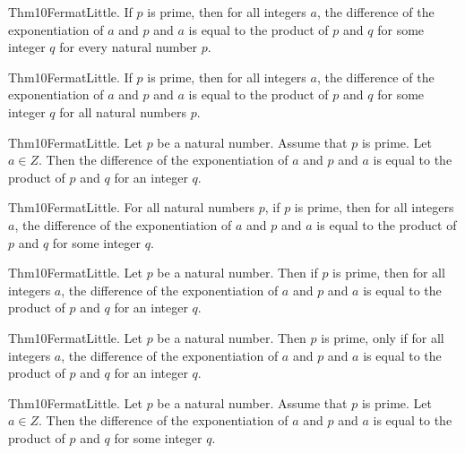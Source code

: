 \documentclass{article}
\begin{document}
Thm10FermatLittle. If $p$ is prime, then for all integers $a$, the difference of the exponentiation of $a$ and $p$ and $a$ is equal to the product of $p$ and $q$ for some integer $q$ for every natural number $p$.

Thm10FermatLittle. If $p$ is prime, then for all integers $a$, the difference of the exponentiation of $a$ and $p$ and $a$ is equal to the product of $p$ and $q$ for some integer $q$ for all natural numbers $p$.

Thm10FermatLittle. Let $p$ be a natural number. Assume that $p$ is prime. Let $a \in Z$. Then the difference of the exponentiation of $a$ and $p$ and $a$ is equal to the product of $p$ and $q$ for an integer $q$.

Thm10FermatLittle. For all natural numbers $p$, if $p$ is prime, then for all integers $a$, the difference of the exponentiation of $a$ and $p$ and $a$ is equal to the product of $p$ and $q$ for some integer $q$.

Thm10FermatLittle. Let $p$ be a natural number. Then if $p$ is prime, then for all integers $a$, the difference of the exponentiation of $a$ and $p$ and $a$ is equal to the product of $p$ and $q$ for an integer $q$.

Thm10FermatLittle. Let $p$ be a natural number. Then $p$ is prime, only if for all integers $a$, the difference of the exponentiation of $a$ and $p$ and $a$ is equal to the product of $p$ and $q$ for an integer $q$.

Thm10FermatLittle. Let $p$ be a natural number. Assume that $p$ is prime. Let $a \in Z$. Then the difference of the exponentiation of $a$ and $p$ and $a$ is equal to the product of $p$ and $q$ for some integer $q$.
\end{document}

